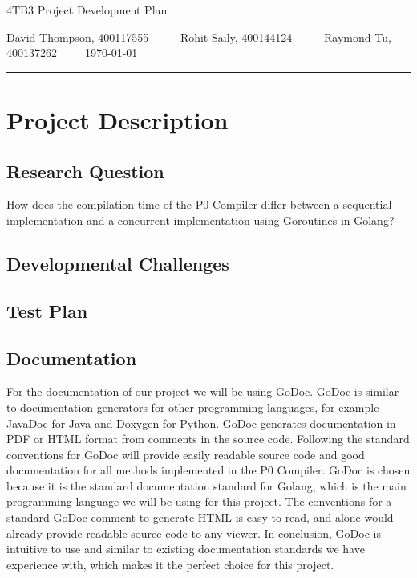 \documentclass{article}
\author{Rohit Saily, David Thompson, Raymond Tu}
\date{\today}
\title{\mytitle}
\newcommand{\mytitle}{4TB3 Project Development Plan}
\begin{document}
{\sffamily
{\huge \mytitle}

\medskip

David Thompson, 400117555~~~~~
Rohit Saily, 400144124~~~~~
Raymond Tu, 400137262~~~~~\today
}

\par\noindent\rule{\textwidth}{0.4pt}
\bigskip

\section{Project Description}

\subsection{Research Question}

How does the compilation time of the P0 Compiler differ between a sequential implementation and a concurrent implementation using Goroutines in Golang?  

\subsection{Developmental Challenges} %

\subsection{Test Plan} %

\subsection{Documentation} %

For the documentation of our project we will be using GoDoc. GoDoc is similar to documentation generators for other programming languages, for example JavaDoc for Java and Doxygen for Python. GoDoc generates documentation in PDF or HTML format from comments in the source code. Following the standard conventions for GoDoc will provide easily readable source code and good documentation for all methods implemented in the P0 Compiler. GoDoc is chosen because it is the standard documentation standard for Golang, which is the main programming language we will be using for this project. The conventions for a standard GoDoc comment to generate HTML is easy to read, and alone would already provide readable source code to any viewer. In conclusion, GoDoc is intuitive to use and similar to existing documentation standards we have experience with, which makes it the perfect choice for this project.
\end{document}
